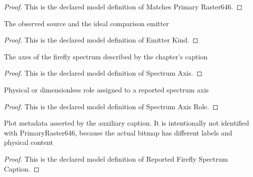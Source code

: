 \begin{proof}
  This is the declared model definition of Matches Primary Raster646.
\end{proof}
\begin{definition}
  \label{def:physics:phyx-mini-0646:phyxminiproblems-problemphyxmini0646-emitterkind}
  The observed source and the ideal comparison emitter
\end{definition}
\begin{proof}
  This is the declared model definition of Emitter Kind.
\end{proof}
\begin{definition}
  \label{def:physics:phyx-mini-0646:phyxminiproblems-problemphyxmini0646-spectrumaxis}
  The axes of the firefly spectrum described by the chapter's caption
\end{definition}
\begin{proof}
  This is the declared model definition of Spectrum Axis.
\end{proof}
\begin{definition}
  \label{def:physics:phyx-mini-0646:phyxminiproblems-problemphyxmini0646-spectrumaxisrole}
  Physical or dimensionless role assigned to a reported spectrum axis
\end{definition}
\begin{proof}
  This is the declared model definition of Spectrum Axis Role.
\end{proof}
\begin{definition}
  \label{def:physics:phyx-mini-0646:phyxminiproblems-problemphyxmini0646-reportedfireflyspectrumcaption}
  Plot metadata asserted by the auxiliary caption. It is intentionally not identified with PrimaryRaster646, because the actual bitmap has different labels and physical content
\end{definition}
\begin{proof}
  This is the declared model definition of Reported Firefly Spectrum Caption.
\end{proof}
